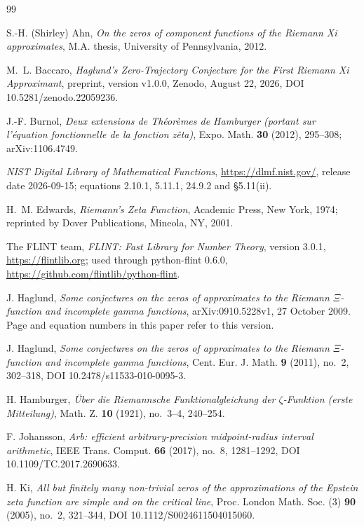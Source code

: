 \documentclass[11pt]{article}
\theoremstyle{plain}
\theoremstyle{definition}
\theoremstyle{remark}
\begin{document}
\begin{thebibliography}{99}

 S.-H. (Shirley) Ahn, \emph{On the zeros of component
functions of the Riemann Xi approximates}, M.A. thesis, University of
Pennsylvania, 2012.

 M.~L. Baccaro, \emph{Haglund's Zero-Trajectory Conjecture
for the First Riemann Xi Approximant}, preprint, version v1.0.0, Zenodo,
August 22, 2026, DOI 10.5281/zenodo.22059236.

 J.-F. Burnol, \emph{Deux extensions de Th\'eor\`emes de
Hamburger (portant sur l'\'equation fonctionnelle de la fonction z\^eta)},
Expo. Math. \textbf{30} (2012), 295--308; arXiv:1106.4749.

 \emph{NIST Digital Library of Mathematical Functions},
\url{https://dlmf.nist.gov/}, release date 2026-09-15; equations 2.10.1,
5.11.1, 24.9.2 and \S5.11(ii).

 H.~M. Edwards, \emph{Riemann's Zeta Function}, Academic
Press, New York, 1974; reprinted by Dover Publications, Mineola, NY, 2001.

 The FLINT team, \emph{FLINT: Fast Library for Number
Theory}, version 3.0.1, \url{https://flintlib.org}; used through python-flint
0.6.0, \url{https://github.com/flintlib/python-flint}.

 J. Haglund, \emph{Some conjectures on the zeros of
approximates to the Riemann $\Xi$-function and incomplete gamma functions},
arXiv:0910.5228v1, 27 October 2009. Page and equation numbers in this paper
refer to this version.

 J. Haglund, \emph{Some conjectures on the zeros of
approximates to the Riemann $\Xi$-function and incomplete gamma functions},
Cent. Eur. J. Math. \textbf{9} (2011), no.~2, 302--318,
DOI 10.2478/s11533-010-0095-3.

 H. Hamburger, \emph{\"Uber die Riemannsche
Funktionalgleichung der $\zeta$-Funktion (erste Mitteilung)}, Math. Z.
\textbf{10} (1921), no.~3--4, 240--254.

 F. Johansson, \emph{Arb: efficient arbitrary-precision
midpoint-radius interval arithmetic}, IEEE Trans. Comput. \textbf{66} (2017),
no.~8, 1281--1292, DOI 10.1109/TC.2017.2690633.

 H. Ki, \emph{All but finitely many non-trivial zeros of the
approximations of the Epstein zeta function are simple and on the critical line},
Proc. London Math. Soc. (3) \textbf{90} (2005), no.~2, 321--344,
DOI 10.1112/S0024611504015060.


\end{thebibliography}
\end{document}
